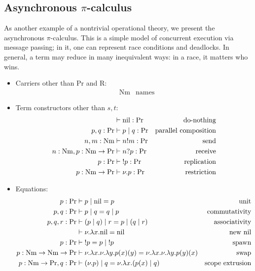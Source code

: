 \documentclass[11pt]{article}
\newcommand{\Proc}{\mathrm{Pr}}
\newcommand{\Rew}{\mathrm{R}}
\newcommand{\Nm}{\mathrm{Nm}}
\begin{document}
\subsection{Asynchronous \texorpdfstring{$\pi$}{π}-calculus}
As another example of a nontrivial operational theory, we present the asynchronous \(\pi\)-calculus.  This is a simple model of concurrent execution via message passing; in it, one can represent race conditions and deadlocks.  In general, a term may reduce in many inequivalent ways: in a race, it matters who wins.

\begin{itemize}
    \item Carriers other than \(\Proc\) and \(\Rew\):
    \begin{align*}
        & \Nm & \mbox{names}
    \end{align*}
    \item Term constructors other than $s,t:$
    \begin{align*}
        &\vdash {\rm nil}: \Proc & \mbox{do-nothing} \\
        p, q: \Proc & \vdash p \;|\; q: \Proc & \mbox{parallel composition}\\
        n, m: \Nm & \vdash n!m: \Proc & \mbox{send} \\
        n: \Nm, p: \Nm \to \Proc & \vdash n?p : \Proc & \mbox{receive} \\
        p: \Proc & \vdash \;!p: \Proc & \mbox{replication}\\
        p: \Nm \to \Proc & \vdash \nu.p: \Proc & \mbox{restriction}
    \end{align*}
    
    \item Equations:
    \begin{align*}
        p: \Proc & \vdash p \;|\; {\rm nil} = p & \mbox{unit}\\
        p, q: \Proc & \vdash p \;|\; q = q \;|\; p & \mbox{commutativity}\\
        p, q, r: \Proc & \vdash (p \;|\; q) \;|\; r = p \;|\; (q \;|\; r) & \mbox{associativity}\\
        &\vdash \nu.\lambda x.{\rm nil} = {\rm nil} & \mbox{new nil}\\
        p:\Proc & \vdash \;!p = p\;|\;!p & \mbox{spawn}\\
        p:\Nm \to \Nm \to \Proc & \vdash \nu.\lambda x.\nu.\lambda y.p(x)(y) = \nu.\lambda x.\nu.\lambda y.p(y)(x) & \mbox{swap}\\
        p:\Nm \to \Proc, q: \Proc & \vdash (\nu.p)\;|\;q = \nu.\lambda x.(p(x) \;|\; q) & \mbox{scope extrusion}
    \end{align*}
    

\end{itemize}
\end{document}
